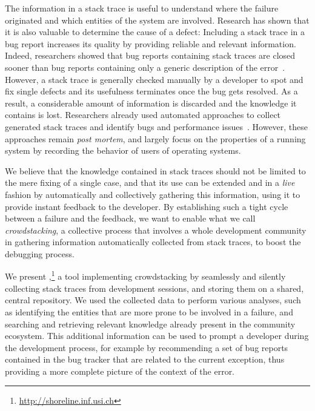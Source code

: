 The information in a stack trace is useful to understand where the failure originated and which entities of the system are involved.
Research has shown that it is also valuable to determine the cause of a defect: Including a stack trace in a bug report increases its quality by providing reliable and relevant information.
Indeed, researchers showed that bug reports containing stack traces are closed sooner than bug reports containing only a generic description of the error~\cite{Zimm2010a,Schr2010a}.
However, a stack trace is generally checked manually by a developer to spot and fix single defects and its usefulness terminates once the bug gets resolved.
As a result, a considerable amount of information is discarded and the knowledge it contains is lost.
Researchers already used automated approaches to collect generated stack traces and identify bugs and performance issues~\cite{Glerum2009,Han2012}.
However, these approaches remain \emph{post mortem}, and largely focus on the properties of a running system by recording the behavior of users of operating systems.

We believe that the knowledge contained in stack traces should not be limited to the mere fixing of a single case, and that its use can be extended and in a \emph{live} fashion by automatically and collectively gathering this information, using it to provide instant feedback to the developer.
By establishing such a tight cycle between a failure and the feedback, we want to enable what we call \emph{crowdstacking}, a collective process that involves a whole development community in gathering information automatically collected from stack traces, to boost the debugging process.

We present \slr,\footnote{\url{http://shoreline.inf.usi.ch}} a tool implementing crowdstacking by seamlessly and silently collecting stack traces from development sessions, and storing them on a shared, central repository.
We used the collected data to perform various analyses, such as identifying the entities that are more prone to be involved in a failure, and searching and retrieving relevant knowledge already present in the community ecosystem.
This additional information can be used to prompt a developer during the development process, for example by recommending  a set of bug reports contained in the bug tracker that are related to the current exception, thus providing a more complete picture of the context of the error.



